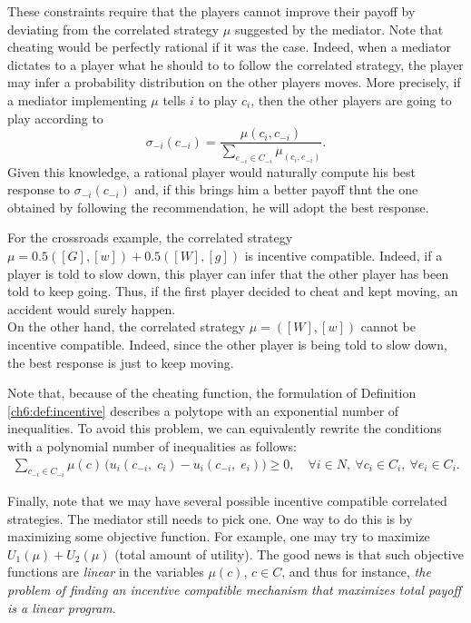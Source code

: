 These constraints require that the players cannot improve their payoff by deviating from the correlated strategy $\mu$ suggested by the mediator. Note that cheating would be perfectly rational if it was the case.
Indeed, when a mediator dictates to a player what he should to to follow the correlated strategy, the player may infer a probability distribution on the other players moves. 
More precisely, if a mediator implementing $\mu$ tells $i$ to play $c_i$, then the other players are going to play according to
$$ \sigma_{-i}(c_{-i}) = \frac{\mu(c_{i}, c_{-i})}{ \sum_{e_{-i} \in C_{-i}} \mu_(c_i, e_{-i})}.$$
Given this knowledge, a rational player would naturally compute his best response to $\sigma_{-i}(c_{-i})$ and, if this brings him a better payoff thnt the one obtained by following the recommendation, he will adopt the best response.

\begin{example}
For the crossroads example, the correlated strategy $\mu = 0.5([G], [w]) + 0.5 ([W],[g])$ is incentive compatible. 
Indeed, if a player is told to slow down, this player can infer that the other player has been told to keep going. Thus, if the first player decided to cheat and kept moving, an accident would surely happen.\\
On the other hand, the correlated strategy $\mu = ([W],[w])$ cannot be incentive compatible. Indeed, since the other player is being told to slow down, the best response is just to keep moving.
\end{example}

 Note that, because of the cheating function, the  formulation of Definition \ref{ch6:def:incentive} describes a polytope with an exponential number of inequalities. To avoid this problem, we can equivalently rewrite the conditions with a polynomial number of inequalities as follows:
\begin{align*}
	\sum_{c_{-i} \in C_{-i}} \mu(c) \, \big( u_i(c_{-i}, \; c_i) - u_i(c_{-i}, \; e_i) \big) \geq 0, \quad \forall i \in N, \ \forall c_i \in C_i, \ \forall e_i \in C_i.
\end{align*}

Finally, note that we may have several possible incentive compatible correlated strategies. The mediator still needs to pick one. 
One way to do this is by maximizing some objective function. For example, 
one may try to maximize $U_1(\mu) + U_2(\mu)$ (total amount of utility). The good news is that such objective functions are \emph{linear} in the variables $\mu(c)$, $c \in C$, and thus for instance, \emph{the problem of finding an incentive compatible mechanism that maximizes total payoff is a linear program}. 

